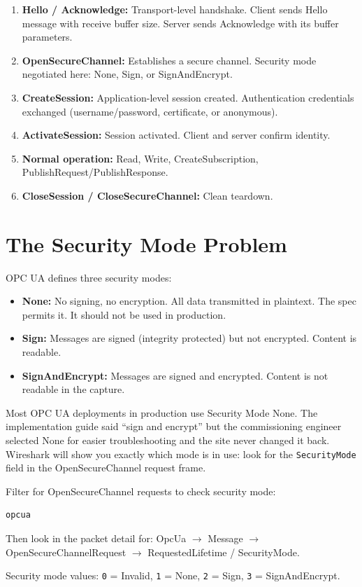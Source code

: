 \documentclass[12pt,twoside,openright]{memoir}
\begin{document}
\begin{enumerate}[noitemsep]
  \item \textbf{Hello / Acknowledge:} Transport-level handshake. Client sends Hello message with receive buffer size. Server sends Acknowledge with its buffer parameters.
  \item \textbf{OpenSecureChannel:} Establishes a secure channel. Security mode negotiated here: None, Sign, or SignAndEncrypt.
  \item \textbf{CreateSession:} Application-level session created. Authentication credentials exchanged (username/password, certificate, or anonymous).
  \item \textbf{ActivateSession:} Session activated. Client and server confirm identity.
  \item \textbf{Normal operation:} Read, Write, CreateSubscription, PublishRequest/PublishResponse.
  \item \textbf{CloseSession / CloseSecureChannel:} Clean teardown.
\end{enumerate}

\section{The Security Mode Problem}

OPC UA defines three security modes:
\begin{itemize}[noitemsep]
  \item \textbf{None:} No signing, no encryption. All data transmitted in plaintext. The spec permits it. It should not be used in production.
  \item \textbf{Sign:} Messages are signed (integrity protected) but not encrypted. Content is readable.
  \item \textbf{SignAndEncrypt:} Messages are signed and encrypted. Content is not readable in the capture.
\end{itemize}

\begin{warningbox}
Most OPC UA deployments in production use Security Mode None. The implementation guide said ``sign and encrypt'' but the commissioning engineer selected None for easier troubleshooting and the site never changed it back. Wireshark will show you exactly which mode is in use: look for the \texttt{SecurityMode} field in the OpenSecureChannel request frame.
\end{warningbox}

\begin{filterbox}
Filter for OpenSecureChannel requests to check security mode:
\begin{lstlisting}
opcua
\end{lstlisting}
Then look in the packet detail for: OpcUa $\to$ Message $\to$ OpenSecureChannelRequest $\to$ RequestedLifetime / SecurityMode.

Security mode values: \texttt{0} = Invalid, \texttt{1} = None, \texttt{2} = Sign, \texttt{3} = SignAndEncrypt.
\end{filterbox}
\end{document}
